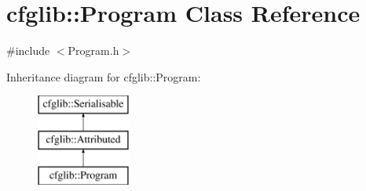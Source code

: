 \hypertarget{classcfglib_1_1Program}{}\section{cfglib\+:\+:Program Class Reference}
\label{classcfglib_1_1Program}


{\ttfamily \#include $<$Program.\+h$>$}

Inheritance diagram for cfglib\+:\+:Program\+:\begin{figure}[H]
\begin{center}
\leavevmode
\includegraphics[height=3.000000cm]{classcfglib_1_1Program}
\end{center}
\end{figure}
